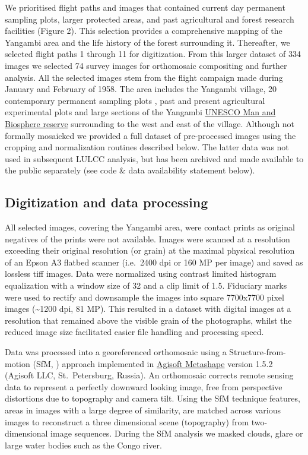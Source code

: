 \documentclass[remote sensing,article,submit,moreauthors,pdftex]{mdpi}
\begin{document}
We prioritised flight paths and images that contained current day
permanent sampling plots, larger protected areas, and past agricultural
and forest research facilities (Figure 2). This selection provides a
comprehensive mapping of the Yangambi area and the life history of the
forest surrounding it. Thereafter, we selected flight paths 1 through 11
for digitization. From this larger dataset of 334 images we selected 74
survey images for orthomosaic compositing and further analysis. All the
selected images stem from the flight campaign made during January and
February of 1958. The area includes the Yangambi village, 20
contemporary permanent sampling plots \citep{Kearsley2013}, past and
present agricultural experimental plots \citep{bauters2015} and large
sections of the Yangambi
\href{http://www.unesco.org/new/en/natural-sciences/environment/ecological-sciences/biosphere-reserves/africa/democratic-republic-of-the-congo/yangambi/}{UNESCO
Man and Biosphere reserve} surrounding to the west and east of the
village. Although not formally mosaicked we provided a full dataset of
pre-processed images using the cropping and normalization routines
described below. The latter data was not used in subsequent LULCC
analysis, but has been archived and made available to the public
separately (see code \& data availability statement below).

\hypertarget{digitization-and-data-processing}{%
\subsection{Digitization and data
processing}\label{digitization-and-data-processing}}

All selected images, covering the Yangambi area, were contact prints as
original negatives of the prints were not available. Images were scanned
at a resolution exceeding their original resolution (or grain) at the
maximal physical resolution of an Epson A3 flatbed scanner (i.e.~2400
dpi or 160 MP per image) and saved as lossless tiff images. Data were
normalized using contrast limited histogram equalization
\citep{zuiderveld1994} with a window size of 32 and a clip limit of 1.5.
Fiduciary marks were used to rectify and downsample the images into
square 7700x7700 pixel images (\textasciitilde{}1200 dpi, 81 MP). This
resulted in a dataset with digital images at a resolution that remained
above the visible grain of the photographs, whilst the reduced image
size facilitated easier file handling and processing speed.

Data was processed into a georeferenced orthomosaic using a
Structure-from-motion (SfM, \citet{ullman1979}) approach implemented in
\href{http://www.agisoft.com}{Agisoft Metashape} version 1.5.2 (Agisoft
LLC, St.~Petersburg, Russia). An orthomosaic corrects remote sensing
data to represent a perfectly downward looking image, free from
perspective distortions due to topography and camera tilt. Using the SfM
technique features, areas in images with a large degree of similarity,
are matched across various images to reconstruct a three dimensional
scene (topography) from two-dimensional image sequences. During the SfM
analysis we masked clouds, glare or large water bodies such as the Congo
river.
\end{document}
